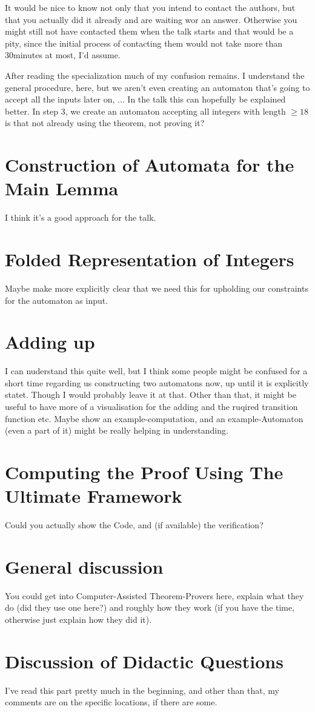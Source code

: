 \documentclass{scrartcl}
\begin{document}
It would be nice to know not only that you intend to contact the authors, but
that you actually did it already and are waiting wor an answer. Otherwise you
might still not have contacted them when the talk starts and that would be a
pity, since the initial process of contacting them would not take more than
30minutes at most, I'd assume.

After reading the specialization much of my confusion remains. I understand the
general procedure, here, but we aren't even creating an automaton that's going
to accept all the inputs later on, ... In the talk this can hopefully be
explained better. In step 3, we create an automaton accepting all integers with
length $\geq 18$ is that not already using the theorem, not proving it?

\section*{Construction of Automata for the Main Lemma}
I think it's a good approach for the talk.

\section*{Folded Representation of Integers}
Maybe make more explicitly clear that we need this for upholding our
constraints for the automaton as input.

\section*{Adding up}
I can nuderstand this quite well, but I think some people might be confused for
a short time regarding us constructing two automatons now, up until it is
explicitly statet. Though I would probably leave it at that. Other than that,
it might be useful to have more of a visualisation for the adding and the
ruqired transition function etc. Maybe show an example-computation, and an
example-Automaton (even a part of it) might be really helping in understanding.

\section*{Computing the Proof Using The Ultimate Framework}
Could you actually show the Code, and (if available) the verification?

\section*{General discussion}
You could get into Computer-Assisted Theorem-Provers here, explain what they do
(did they use one here?) and roughly how they work (if you have the time,
otherwise just explain how they did it).

\section*{Discussion of Didactic Questions}
I've read this part pretty much in the beginning, and other than that, my
comments are on the specific locations, if there are some.
\end{document}

